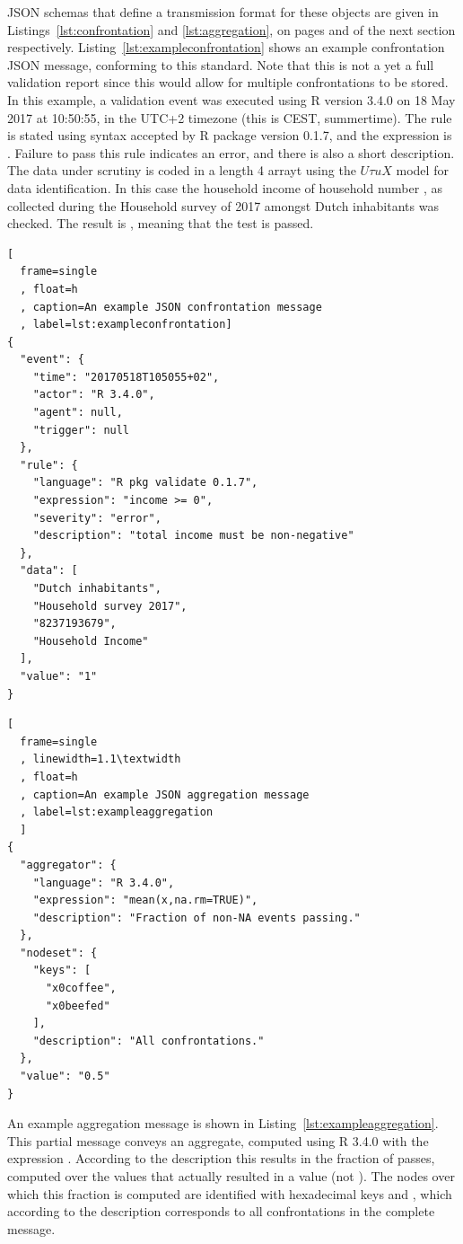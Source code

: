 JSON schemas that define a transmission format for these objects are given in
Listings~\ref{lst:confrontation} and \ref{lst:aggregation}, on pages
\pageref{lst:confrontation} and \pageref{lst:aggregation} of the next section
respectively. Listing~\ref{lst:exampleconfrontation} shows an example
confrontation JSON message, conforming to this standard. Note that this is not
a yet a full validation report since this would allow for multiple
confrontations to be stored.  In this example, a validation event was executed
using R version 3.4.0 on 18 May 2017 at 10:50:55, in the UTC+2 timezone (this
is CEST, summertime).  The rule is stated using syntax accepted by R package
 version 0.1.7, and the expression is .
Failure to pass this rule indicates an error, and there is also a short
description. The data under scrutiny is coded in a length 4 arrayt using the
$U\tau uX$ model for data identification.  In this case the household income of
household number , as collected during the Household survey
of 2017 amongst Dutch inhabitants was checked. The result is , meaning
that the test is passed.
%
\begin{lstlisting}[
  frame=single
  , float=h
  , caption=An example JSON confrontation message
  , label=lst:exampleconfrontation]
{
  "event": {
    "time": "20170518T105055+02",
    "actor": "R 3.4.0",
    "agent": null,
    "trigger": null
  },
  "rule": {
    "language": "R pkg validate 0.1.7",
    "expression": "income >= 0",
    "severity": "error",
    "description": "total income must be non-negative"
  },
  "data": [
    "Dutch inhabitants",
    "Household survey 2017",
    "8237193679",
    "Household Income"
  ],
  "value": "1"
}
\end{lstlisting}
\begin{lstlisting}[
  frame=single
  , linewidth=1.1\textwidth
  , float=h
  , caption=An example JSON aggregation message
  , label=lst:exampleaggregation
  ]
{
  "aggregator": {
    "language": "R 3.4.0",
    "expression": "mean(x,na.rm=TRUE)",
    "description": "Fraction of non-NA events passing."
  },
  "nodeset": {
    "keys": [
      "x0coffee",
      "x0beefed"
    ],
    "description": "All confrontations."
  },
  "value": "0.5"
}
\end{lstlisting}

An example aggregation message is shown in
Listing~\ref{lst:exampleaggregation}.  This partial message conveys an
aggregate, computed using R 3.4.0 with the expression . According to the description this results in the fraction of
passes, computed over the values that actually resulted in a value (not \na{}).
The nodes over which this fraction is computed are identified with hexadecimal
keys  and , which according to the description
corresponds to all confrontations in the complete message.
%


